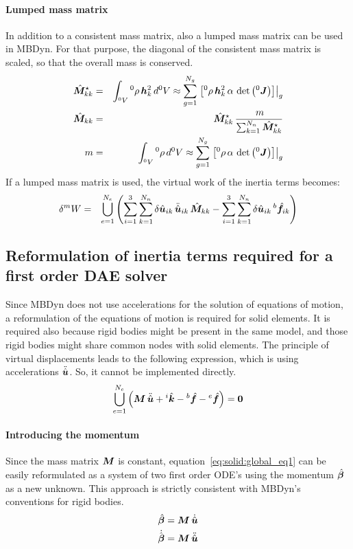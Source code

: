 \paragraph{Lumped mass matrix}
In addition to a consistent mass matrix, also a lumped mass matrix can be used in MBDyn.
For that purpose, the diagonal of the consistent mass matrix is scaled, so that the overall mass is conserved.
\begin{eqnarray}
\hat{\bm{M}}_{kk}^{\star} & = & \int_{^0V} {^0}\rho \, \bm{h}_k^2 \, d^0V \approx \sum_{g=1}^{N_g} \left.\left[{^0}\rho \, \bm{h}_k^2 \, \alpha \, \det{\left({^0}\bm{J}\right)}\right]\right\vert_{g} \\
\hat{\bm{M}}_{kk}&=&\hat{\bm{M}}_{kk}^{\star} \, \frac{\,m}{\sum_{k=1}^{N_n}\hat{\bm{M}}_{kk}^{\star}} \\
m&=&\int_{^0V}{^0}\rho\,d{^0V} \approx \sum_{g=1}^{N_g} \left.\left[{^0}\rho \, \alpha \, \det{\left(^0\bm{J}\right)}\right]\right\vert_{g}
\end{eqnarray}
If a lumped mass matrix is used, the virtual work of the inertia terms becomes:
\begin{eqnarray}
\delta^{m}W & = & \bigcup_{e=1}^{N_e}\left(\sum_{i=1}^3\sum_{k=1}^{N_n}\delta\hat{\bm{u}}_{ik} \, \ddot{\hat{\bm{u}}}_{ik} \, \hat{\bm{M}}_{kk}
 - \sum_{i=1}^3\sum_{k=1}^{N_n} \delta\hat{\bm{u}}_{ik} \, {^b}\hat{\bm{f}}_{ik}\right)
\end{eqnarray}

\subsection{Reformulation of inertia terms required for a first order DAE solver}
Since MBDyn does not use accelerations for the solution of equations of motion, a reformulation of the equations of motion is required for solid elements.
It is required also because rigid bodies might be present in the same model, and those rigid bodies might share common nodes with solid elements.
The principle of virtual displacements leads to the following expression, which is using accelerations $\ddot{\hat{\bm{u}}}$.
So, it cannot be implemented directly.
\begin{eqnarray}
\bigcup_{e=1}^{N_e} \left(\bm{M} \, \ddot{\hat{\bm{u}}} + {^i}\hat{\bm{k}} - {^b}\hat{\bm{f}} - {^e}\hat{\bm{f}}\right) = \bm{0} \label{eq:solid:global_eq1}
\end{eqnarray}

\paragraph{Introducing the momentum}
Since the mass matrix $\bm{M}$ is constant,
equation~\ref{eq:solid:global_eq1} can be easily reformulated as a system of two first order ODE's
using the momentum $\hat{\bm{\beta}}$ as a new unknown.
This approach is strictly consistent with MBDyn's conventions for rigid bodies.
\begin{eqnarray}
\hat{\bm{\beta}}=\bm{M}\,\dot{\hat{\bm{u}}} \label{eq:solid:beta} \\
\dot{\hat{\bm{\beta}}}=\bm{M}\,\ddot{\hat{\bm{u}}} \label{eq:solid:betadot}
\end{eqnarray}

